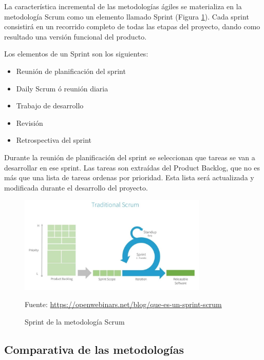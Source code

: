 La característica incremental de las metodologías ágiles se materializa en la metodología Scrum como un elemento llamado Sprint (Figura \ref{fig:sprint_scrum}). Cada sprint consistirá en un recorrido completo de todas las etapas del proyecto, dando como resultado una versión funcional del producto.

Los elementos de un Sprint son los siguientes:

\begin{itemize}
    \item Reunión de planificación del sprint
    \item Daily Scrum ó reunión diaria
    \item Trabajo de desarrollo
    \item Revisión
    \item Retrospectiva del sprint
\end{itemize}

Durante la reunión de planificación del sprint se seleccionan que tareas se van a desarrollar en ese sprint. Las tareas son extraídas del Product Backlog, que no es más que una lista de tareas ordenas por prioridad. Esta lista será actualizada y modificada durante el desarrollo del proyecto.

\begin{figure}[h]
    \centering
    \includegraphics[width=0.8\textwidth]{imagenes/03_Analisis/sprint_scrum.jpg}
    \begin{center}
        Fuente: \url{https://openwebinars.net/blog/que-es-un-sprint-scrum}
    \end{center}
    \caption{Sprint de la metodología Scrum}
    \label{fig:sprint_scrum}
\end{figure}


\subsection{Comparativa de las metodologías}

